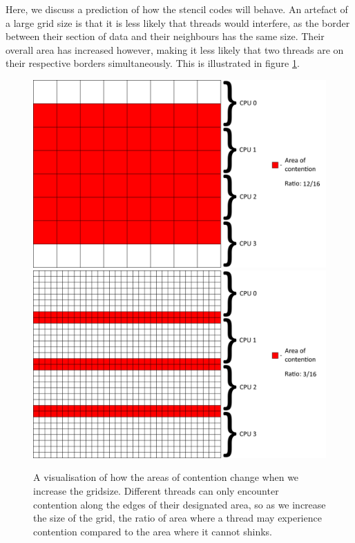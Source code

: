 Here, we discuss a prediction of how the stencil codes will behave. An artefact of a large grid size is that it is less likely that threads would interfere, as the border between their section of data and their neighbours has the same size. Their overall area has increased however, making it less likely that two threads are on their respective borders simultaneously. This is illustrated in figure \ref{fig:grid_comparison}.



\begin{figure}[ph]
    \includegraphics[width=1\textwidth]{graphics/8_with_info.png}
    \includegraphics[width=1\textwidth]{graphics/32_with_info.png}
    \caption{A visualisation of how the areas of contention change when we increase the gridsize. Different threads can only encounter contention along the edges of their designated area, so as we increase the size of the grid, the ratio of area where a thread may experience contention compared to the area where it cannot shinks.}
    \label{fig:grid_comparison}
\end{figure}



